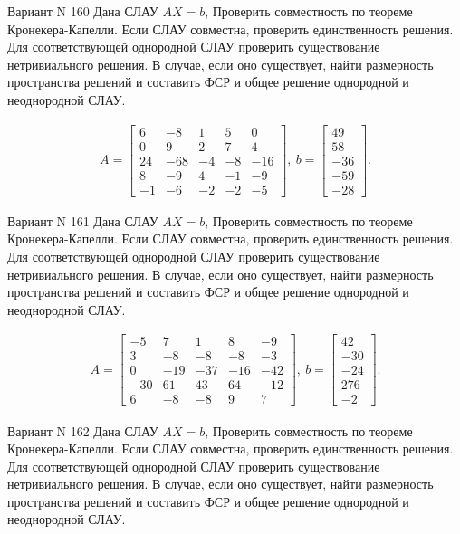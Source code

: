 \documentclass[11pt]{report}
\begin{document}
Вариант N 160
Дана СЛАУ $AX = b$,
Проверить совместность по теореме Кронекера-Капелли. Если СЛАУ совместна, проверить единственность решения.
Для соответствующей однородной СЛАУ проверить существование нетривиального решения. В случае, если оно существует,
найти размерность пространства решений и составить ФСР и общее решение однородной  и неоднородной СЛАУ.


\begin{align*}
 A = \left[\begin{matrix}6 & -8 & 1 & 5 & 0\\0 & 9 & 2 & 7 & 4\\24 & -68 & -4 & -8 & -16\\8 & -9 & 4 & -1 & -9\\-1 & -6 & -2 & -2 & -5\end{matrix}\right],
\ b = \left[\begin{matrix}49\\58\\-36\\-59\\-28\end{matrix}\right]. 
 \end{align*}

Вариант N 161
Дана СЛАУ $AX = b$,
Проверить совместность по теореме Кронекера-Капелли. Если СЛАУ совместна, проверить единственность решения.
Для соответствующей однородной СЛАУ проверить существование нетривиального решения. В случае, если оно существует,
найти размерность пространства решений и составить ФСР и общее решение однородной  и неоднородной СЛАУ.


\begin{align*}
 A = \left[\begin{matrix}-5 & 7 & 1 & 8 & -9\\3 & -8 & -8 & -8 & -3\\0 & -19 & -37 & -16 & -42\\-30 & 61 & 43 & 64 & -12\\6 & -8 & -8 & 9 & 7\end{matrix}\right],
\ b = \left[\begin{matrix}42\\-30\\-24\\276\\-2\end{matrix}\right]. 
 \end{align*}

Вариант N 162
Дана СЛАУ $AX = b$,
Проверить совместность по теореме Кронекера-Капелли. Если СЛАУ совместна, проверить единственность решения.
Для соответствующей однородной СЛАУ проверить существование нетривиального решения. В случае, если оно существует,
найти размерность пространства решений и составить ФСР и общее решение однородной  и неоднородной СЛАУ.
\end{document}

